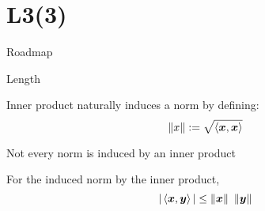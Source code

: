 \documentclass[fleqn,aspectratio=169]{beamer}
\begin{document}
\section{L3(3)}
\begin{frame}{Roadmap}

\plitemsep 0.1in

\bce[(1)] 
\item {}

\item {}

\item {}

\ece
\end{frame}


\begin{frame}{Length}

\plitemsep 0.2in

\bci 

\item Inner product naturally induces a norm by defining:
$$
\left \lVert x \right \rVert := \sqrt{\left\langle \bm{x}, \bm{x} \right\rangle}
$$

\item Not every norm is induced by an inner product

\item {} For the induced norm by the inner product, 
$$
|\inner{\vec{x}}{\vec{y}}| \le \norm{\vec{x}} \ \norm{\vec{y}}
$$

\eci
\end{frame}
\end{document}

